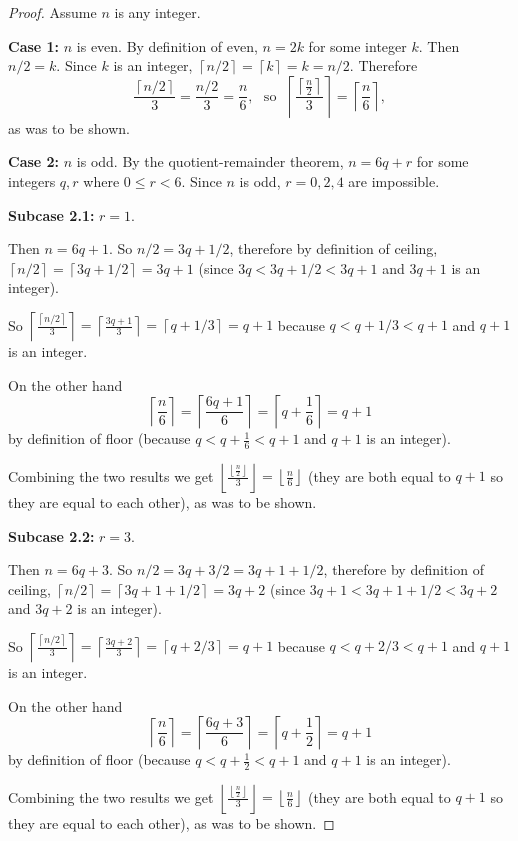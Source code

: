 \documentclass[14pt]{extarticle}
\newcommand{\floor}[1]{{\left\lfloor#1\right\rfloor}}
\newcommand{\ceil}[1]{{\left\lceil#1\right\rceil}}
\begin{document}
\begin{proof}
    Assume $n$ is any integer.

        {\bf Case 1:} $n$ is even. By definition of even, $n = 2k$ for some integer $k$. Then $n/2 = k$. Since $k$ is an integer, $\ceil{n/2} = \ceil{k} = k = n/2$. Therefore
    \[
        \frac{\ceil{n/2}}{3} = \frac{n/2}{3} = \frac{n}{6}, \,\, \text{ so } \,\, \ceil{\frac{\ceil{\frac{n}{2}}}{3}} = \ceil{\frac{n}{6}},
    \]
    as was to be shown.

        {\bf Case 2:} $n$ is odd. By the quotient-remainder theorem, $n = 6q+r$ for some integers $q,r$ where $0 \leq r < 6$. Since $n$ is odd, $r = 0, 2, 4$ are impossible.

        {\bf Subcase 2.1:} $r = 1$.

    Then $n = 6q+1$. So $n/2 = 3q+1/2$, therefore by definition of ceiling, $\ceil{n/2} = \ceil{3q+1/2} = 3q+1$ (since $3q < 3q+1/2< 3q+1$ and $3q+1$ is an integer).

    So $\ceil{\frac{\ceil{n/2}}{3}} = \ceil{\frac{3q+1}{3}} = \ceil{q+1/3} = q+1$ because $q < q+1/3 < q+1$ and $q+1$ is an integer.

    On the other hand
    \[
        \ceil{\frac{n}{6}} = \ceil{\frac{6q+1}{6}} = \ceil{q+\frac{1}{6}} = q+1
    \]
    by definition of floor (because $q < q+\frac{1}{6} < q+1$ and $q+1$ is an integer).

    Combining the two results we get $ \floor{\frac{\floor{\frac{n}{2}}}{3}} = \floor{\frac{n}{6}}$ (they are both equal to $q+1$ so they are equal to each other), as was to be shown.

        {\bf Subcase 2.2:} $r = 3$.

    Then $n = 6q+3$. So $n/2 = 3q+3/2 = 3q+1+1/2$, therefore by definition of ceiling, $\ceil{n/2} = \ceil{3q+1+1/2} = 3q+2$ (since $3q+1 < 3q+1+1/2< 3q+2$ and $3q+2$ is an integer).

    So $\ceil{\frac{\ceil{n/2}}{3}} = \ceil{\frac{3q+2}{3}} = \ceil{q+2/3} = q+1$ because $q < q+2/3 < q+1$ and $q+1$ is an integer.

    On the other hand
    \[
        \ceil{\frac{n}{6}} = \ceil{\frac{6q+3}{6}} = \ceil{q+\frac{1}{2}} = q+1
    \]
    by definition of floor (because $q < q+\frac{1}{2} < q+1$ and $q+1$ is an integer).

    Combining the two results we get $ \floor{\frac{\floor{\frac{n}{2}}}{3}} = \floor{\frac{n}{6}}$ (they are both equal to $q+1$ so they are equal to each other), as was to be shown.


\end{proof}
\end{document}
